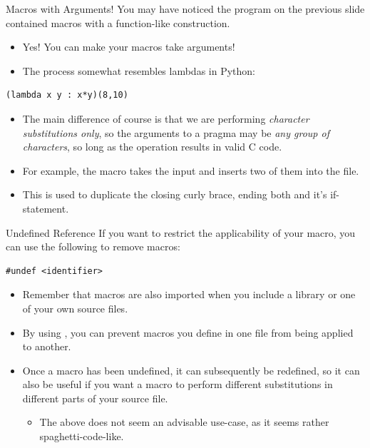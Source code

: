 \documentclass[11pt]{beamer}
\let\OldTexttt\texttt
\renewcommand{\texttt}[1]{\OldTexttt{\color{teal}{#1}}}
\begin{document}
\begin{frame}[fragile=singleslide]{Macros with Arguments!}
You may have noticed the program on the previous slide contained macros with a function-like construction.
\begin{itemize}
\item Yes! You can make your macros take arguments! 
\item The process somewhat resembles lambdas in Python:
\end{itemize}
\begin{lstlisting}[style=Python]
(lambda x y : x*y)(8,10)
\end{lstlisting}
\begin{itemize}
\item The main difference of course is that we are performing \emph{character substitutions only}, so the arguments to a pragma may be \emph{any group of characters}, so long as the operation results in valid C code.  
\item For example, the macro \texttt{TWICE(x) x x} takes the input \texttt{x} and inserts two of them into the file.  
\item This is used to duplicate the closing curly brace, ending both \texttt{main} and it's if-statement.  
\end{itemize}
\end{frame}

\begin{frame}[fragile=singleslide]{Undefined Reference}
If you want to restrict the applicability of your macro, you can use the following to remove macros:
\begin{lstlisting}[style=C]
#undef <identifier>
\end{lstlisting}
\begin{itemize}
\item Remember that macros are also imported when you include a library or one of your own source files.  
\item By using \texttt{\#undef}, you can prevent macros you define in one file from being applied to another.  
\item Once a macro has been undefined, it can subsequently be redefined, so it can also be useful if you want a macro to perform different substitutions in different parts of your source file.
\begin{itemize}
\item The above does not seem an advisable use-case, as it seems rather spaghetti-code-like.
\end{itemize}
\end{itemize}
\end{frame}
\end{document}
